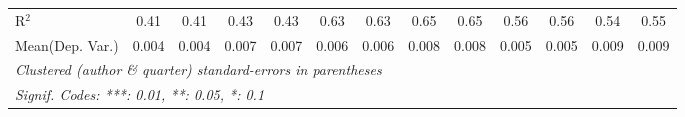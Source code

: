 \begin{tabular}{lcccccccccccc}
   R$^2$                                    & 0.41          & 0.41           & 0.43    & 0.43          & 0.63    & 0.63     & 0.65    & 0.65        & 0.56         & 0.56          & 0.54    & 0.55\\  
Mean(Dep. Var.) & 0.004 & 0.004 & 0.007 & 0.007 & 0.006 & 0.006 & 0.008 & 0.008 & 0.005 & 0.005 & 0.009 & 0.009 \\
   \midrule \midrule
   \multicolumn{13}{l}{\emph{Clustered (author \& quarter) standard-errors in parentheses}}\\
   \multicolumn{13}{l}{\emph{Signif. Codes: ***: 0.01, **: 0.05, *: 0.1}}\\
\end{tabular}
\par\endgroup
